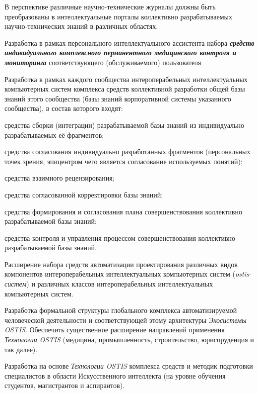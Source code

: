 \begin{textitemize}
\begin{textitemize}
		В перспективе различные научно-технические журналы должны быть преобразованы в интеллектуальные порталы коллективно разрабатываемых научно-технических знаний в различных областях.
	\end{textitemize}
	\item
	Разработка в рамках персонального интеллектуального ассистента набора \textbf{\textit{средств индивидуального комплексного перманентного медицинского контроля и мониторинга}} соответствующего (обслуживаемого) пользователя
	\medskip
	\item Разработка в рамках каждого сообщества интероперабельных интеллектуальных компьютерных систем комплекса средств коллективной разработки общей базы знаний этого сообщества (базы знаний корпоративной системы указанного сообщества), в состав которого входят:
	\begin{textitemize}
		\item средства сборки (интеграции) разрабатываемой базы знаний из индивидуально разрабатываемых её фрагментов;
		\item средства согласования индивидуально разработанных фрагментов (персональных точек зрения, эпицентром чего является согласование используемых понятий);
		\item средства взаимного рецензирования;
		\item средства согласованной корректировки базы знаний;
		\item средства формирования и согласования плана совершенствования коллективно разрабатываемой базы знаний;
		\item средства контроля и управления процессом совершенствования коллективно разрабатываемой базы знаний.
	\end{textitemize}
	\item Расширение набора средств автоматизации проектирования различных видов компонентов интероперабельных интеллектуальных компьютерных систем (\textit{ostis-систем}) и различных классов интероперабельных интеллектуальных компьютерных систем.
	\medskip
	\item Разработка формальной структуры глобального комплекса автоматизируемой человеческой деятельности и соответствующей этому архитектуры \textit{Экосистемы OSTIS}. Обеспечить существенное расширение направлений применения \textit{Технологии OSTIS} (медицина, промышленность, строительство, юриспруденция и так далее).
	\medskip
	\item Разработка на основе \textit{Технологии OSTIS} комплекса средств и методик подготовки специалистов в области Искусственного интеллекта (на уровне обучения студентов, магистрантов и аспирантов).

\end{textitemize}
